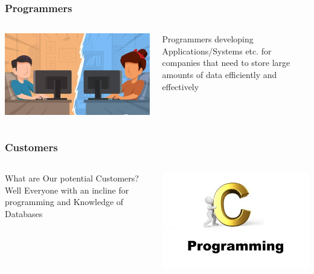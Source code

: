 \documentclass{beamer}
\begin{document}
\begin{frame}
	\frametitle{Programmers}	
	\begin{columns}
	\begin{column}{0.4\textwidth}
		\includegraphics[width=\textwidth]{developer.png}
	\end{column}	
	\begin{column}{0.4\textwidth}
	Programmers developing Applications/Systems etc. for companies that need to store large amounts of data efficiently and effectively 
	\end{column}
	\end{columns}
	
\end{frame}

\begin{frame}
	\frametitle{Customers}
	\begin{columns}
	\begin{column}{0.4\textwidth}
			What are Our potential Customers? \\ Well Everyone with an incline for programming and Knowledge of Databases
	\end{column}
		\begin{column}{0.4\textwidth} 	
		\includegraphics[width=\columnwidth]{programmingphoto.png}
		\end{column}
		\end{columns}
\end{frame}
\end{document}

